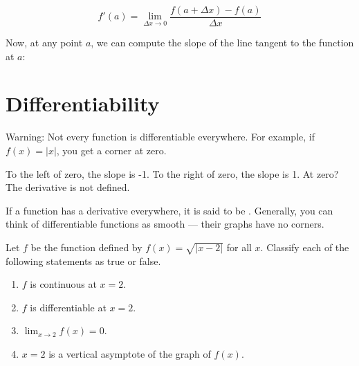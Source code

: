 $$f'(a) = \lim_{\Delta x \rightarrow 0}\frac{f(a + \Delta x) - f(a)}{\Delta x}$$

Now, at any point $a$, we can compute the slope of the line tangent to 
the function at $a$:


\section{Differentiability}

Warning: Not every function is differentiable everywhere.  For
example, if $f(x) = |x|$, you get a corner at zero.


To the left of zero, the slope is -1. To the right of zero, the slope
is 1.  At zero?  The derivative is not defined.

If a function has a derivative everywhere, it is said to be
. Generally, you can think of differentiable
functions as smooth --- their graphs have no corners.

\begin{Exercise} Let $f$ 
	be the function defined by $f(x) = \sqrt{|x - 2|}$ for all $x$. 
	Classify each of the following statements as true or false. 
	\begin{enumerate}
		\item $f$ is continuous at $x = 2$. 
		\item $f$ is differentiable at $x = 2$.
		\item $\lim_{x \to 2} f(x) = 0$.
		\item $x = 2$ is a vertical asymptote of the graph of $f(x)$. 
	\end{enumerate}
\end{Exercise}


